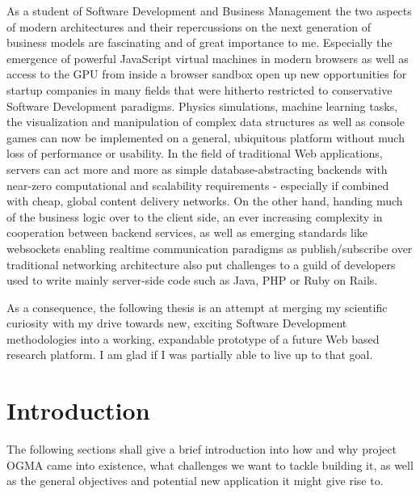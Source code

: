As a student of Software Development and Business Management the two aspects of modern architectures and their repercussions on the next generation of business models are fascinating and of great importance to me. Especially the emergence of powerful JavaScript virtual machines in modern browsers as well as access to the GPU from inside a browser sandbox open up new opportunities for startup companies in many fields that were hitherto restricted to conservative Software Development paradigms. Physics simulations, machine learning tasks, the visualization and manipulation of complex data structures as well as console games can now be implemented on a general, ubiquitous platform without much loss of performance or usability. In the field of traditional Web applications, servers can act more and more as simple database-abstracting backends with near-zero computational and scalability requirements - especially if combined with cheap, global content delivery networks. On the other hand, handing much of the business logic over to the client side, an ever increasing complexity in cooperation between backend services, as well as emerging standards like websockets enabling realtime communication paradigms as publish/subscribe over traditional networking architecture also put challenges to a guild of developers used to write mainly server-side code such as Java, PHP or Ruby on Rails.

As a consequence, the following thesis is an attempt at merging my scientific curiosity with my drive towards new, exciting Software Development methodologies into a working, expandable prototype of a future Web based research platform. I am glad if I was partially able to live up to that goal.




\chapter{Introduction}
\label{ch:introduction}

The following sections shall give a brief introduction into how and why project OGMA came into existence, what challenges we want to tackle building it, as well as the general objectives and potential new application it might give rise to.


